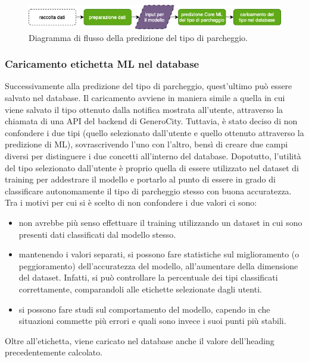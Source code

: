 \begin{figure}
    \centering
    \includegraphics[width=14cm]{images/flow_diagram_predizione_tipo.png}
    \caption{Diagramma di flusso della predizione del tipo di parcheggio.}
    \label{fig:flow_diagram_predizione_tipo}
\end{figure}


\subsubsection{Caricamento etichetta ML nel database}

Successivamente alla predizione del tipo di parcheggio, quest'ultimo può essere salvato
nel database. Il caricamento avviene in maniera simile a quella in cui viene salvato il 
tipo ottenuto dalla notifica mostrata all'utente, attraverso la chiamata di una API del 
backend di GeneroCity. Tuttavia, è stato deciso di non confondere i due tipi (quello
selezionato dall'utente e quello ottenuto attraverso la predizione di ML), sovrascrivendo
l'uno con l'altro, bensì di creare due campi diversi per distinguere i due concetti
all'interno del database. Dopotutto, l'utilità del tipo selezionato dall'utente è proprio
quella di essere utilizzato nel dataset di training per addestrare il modello e portarlo 
al punto di essere in grado di classificare autonomamente il tipo di parcheggio stesso
con buona accuratezza.
Tra i motivi per cui si è scelto di non confondere i due valori ci sono:
\begin{itemize}
    \item non avrebbe più senso effettuare il training utilizzando un dataset in cui sono
    presenti dati classificati dal modello stesso.
    \item mantenendo i valori separati, si possono fare statistiche sul miglioramento
    (o peggioramento) dell'accuratezza del modello, all'aumentare della dimensione del
    dataset. Infatti, si può controllare la percentuale dei tipi classificati correttamente,
    comparandoli alle etichette selezionate dagli utenti.
    \item si possono fare studi sul comportamento del modello, capendo in che situazioni
    commette più errori e quali sono invece i suoi punti più stabili.
\end{itemize}
Oltre all'etichetta, viene caricato nel database anche il valore dell'heading 
precedentemente calcolato.











